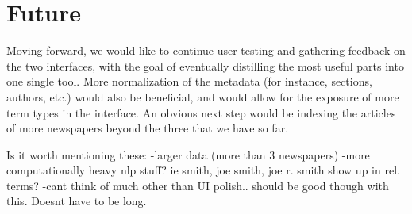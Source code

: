 \section{Future}
Moving forward, we would like to continue user testing and gathering feedback on the two interfaces, with the goal of eventually distilling the most useful parts into one single tool. More normalization of the metadata (for instance, sections, authors, etc.) would also be beneficial, and would allow for the exposure of more term types in the interface. An obvious next step would be indexing the articles of more newspapers beyond the three that we have so far. 


Is it worth mentioning these:
-larger data (more than 3 newspapers)
-more computationally heavy nlp stuff? ie smith, joe smith, joe r. smith show up in rel. terms?
-cant think of much other than UI polish.. should be good though with this. Doesnt have to be long.
